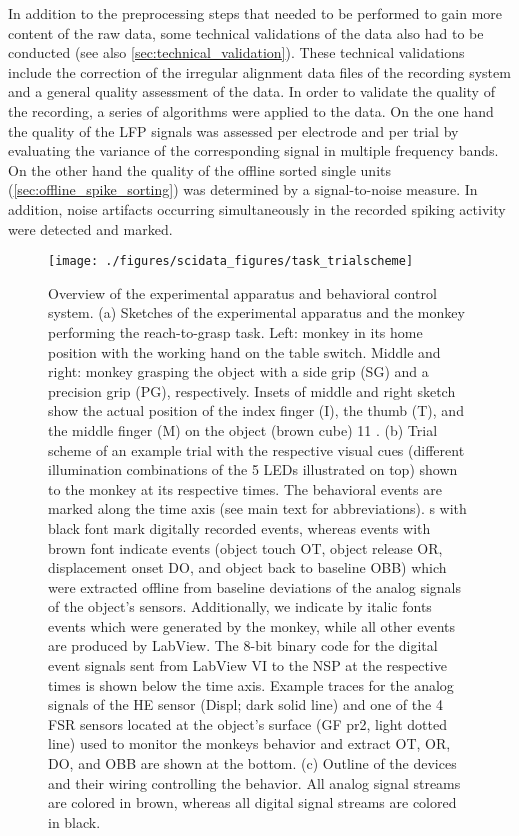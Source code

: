 In addition to the preprocessing steps that needed to be performed to gain more content of the raw data, some technical validations of the data also had to be conducted (see also \cref{sec:technical_validation}). These technical validations include the correction of the irregular alignment data files of the recording system and a general quality assessment of the data. In order to validate the quality of the recording, a series of algorithms were applied to the data. On the one hand the quality of the LFP signals was assessed per electrode and per trial by evaluating the variance of the corresponding signal in multiple frequency bands. On the other hand the quality of the offline sorted single units (\cref{sec:offline_spike_sorting}) was determined by a signal-to-noise measure. In addition, noise artifacts occurring simultaneously in the recorded spiking activity were detected and marked.


\begin{figure}
 \centering
 \texttt{[image: ./figures/scidata\_figures/task\_trialscheme]}
 \caption[Overview of the experimental apparatus and behavioral control system.]{Overview of the experimental apparatus and behavioral control system. (a) Sketches of the experimental apparatus and the monkey performing the reach-to-grasp task. Left: monkey in its home position with the working hand on the table switch. Middle and right: monkey grasping the object with a side grip (SG) and a precision grip (PG), respectively. Insets of middle and right sketch show the actual position of the index finger (I), the thumb (T), and the middle finger (M) on the object (brown cube) 11 . (b) Trial scheme of an example trial with
the respective visual cues (different illumination combinations of the 5 LEDs illustrated on top) shown to the monkey at its respective times. The behavioral events are marked along the time axis (see main text for abbreviations). s with black font mark digitally recorded events, whereas events with brown font indicate events (object touch OT, object release OR, displacement onset DO, and object back to baseline OBB) which were extracted offline from baseline deviations of the analog signals of the object’s sensors. Additionally, we indicate by italic fonts events which were generated by the monkey, while all other events are produced by LabView. The 8-bit binary code for the digital event signals sent from LabView VI to the NSP at the respective times is shown below the time axis. Example traces for the analog signals of the HE sensor (Displ; dark solid line) and one of the 4 FSR sensors located at the object’s surface (GF pr2, light dotted line) used to monitor the monkeys behavior and extract
OT, OR, DO, and OBB are shown at the bottom. (c) Outline of the devices and their wiring controlling the behavior. All analog signal streams are colored in brown, whereas all digital signal streams are colored in black.}
\label{fig:task_trialscheme}
\end{figure}

